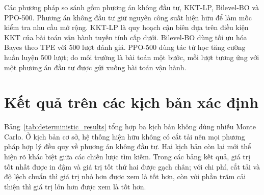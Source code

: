 Các phương pháp so sánh gồm phương án không đầu tư, KKT-LP, Bilevel-BO và PPO-500. Phương án không đầu tư giữ nguyên công suất hiện hữu để làm mốc kiểm tra nhu cầu mở rộng. KKT-LP là quy hoạch cận biên dựa trên điều kiện KKT của bài toán vận hành tuyến tính cấp dưới. Bilevel-BO dùng tối ưu hóa Bayes theo TPE với 500 lượt đánh giá. PPO-500 dùng tác tử học tăng cường huấn luyện 500 lượt; do môi trường là bài toán một bước, mỗi lượt tương ứng với một phương án đầu tư được gửi xuống bài toán vận hành.

\section{Kết quả trên các kịch bản xác định}

Bảng~\ref{tab:deterministic_results} tổng hợp ba kịch bản không dùng nhiễu Monte Carlo. Ở kịch bản cơ sở, hệ thống hiện hữu không có cắt tải nên mọi phương pháp hợp lý đều quy về phương án không đầu tư. Hai kịch bản còn lại mới thể hiện rõ khác biệt giữa các chiến lược tìm kiếm. Trong các bảng kết quả, giá trị tốt nhất được in đậm và giá trị tốt thứ hai được gạch chân; với chi phí, cắt tải và độ lệch chuẩn thì giá trị nhỏ hơn được xem là tốt hơn, còn với phần trăm cải thiện thì giá trị lớn hơn được xem là tốt hơn.

